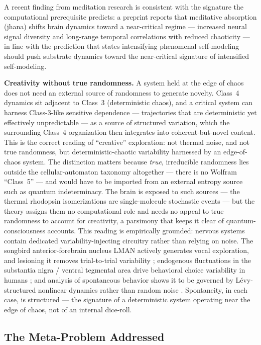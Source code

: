 \documentclass[12pt]{article}
\newcommand{\revstart}{}
\newcommand{\revend}{}
\begin{document}
{\revstart A recent finding from meditation research is consistent with the signature the computational prerequisite predicts: a preprint \citep{Mago2025} reports that meditative absorption (jhana) shifts brain dynamics toward a near-critical regime --- increased neural signal diversity and long-range temporal correlations with reduced chaoticity --- in line with the prediction that states intensifying phenomenal self-modeling should push substrate dynamics toward the near-critical signature of intensified self-modeling.\revend}

\textbf{Creativity without true randomness.} A system held at the edge of chaos does not need an external source of randomness to generate novelty. Class~4 dynamics sit adjacent to Class~3 (deterministic chaos), and a critical system can harness Class-3-like sensitive dependence --- trajectories that are deterministic yet effectively unpredictable --- as a source of structured variation, which the surrounding Class~4 organization then integrates into coherent-but-novel content. This is the correct reading of ``creative'' exploration: not thermal noise, and not true randomness, but deterministic-chaotic variability harnessed by an edge-of-chaos system. The distinction matters because \emph{true}, irreducible randomness lies outside the cellular-automaton taxonomy altogether --- there is no Wolfram ``Class~5'' --- and would have to be imported from an external entropy source such as quantum indeterminacy. The brain is exposed to such sources — the thermal rhodopsin isomerizations are single-molecule stochastic events — but the theory assigns them no computational role and needs no appeal to true randomness to account for creativity, a parsimony that keeps it clear of quantum-consciousness accounts. This reading is empirically grounded: nervous systems contain dedicated variability-injecting circuitry rather than relying on noise. The songbird anterior-forebrain nucleus LMAN actively generates vocal exploration, and lesioning it removes trial-to-trial variability \citep{Olveczky2005}; endogenous fluctuations in the substantia nigra / ventral tegmental area drive behavioral choice variability in humans \citep{Chew2019}; and analysis of spontaneous behavior shows it to be governed by L\'evy-structured nonlinear dynamics rather than random noise \citep{Maye2007}. Spontaneity, in each case, is structured --- the signature of a deterministic system operating near the edge of chaos, not of an internal dice-roll.


\subsection{The Meta-Problem Addressed}
\end{document}
